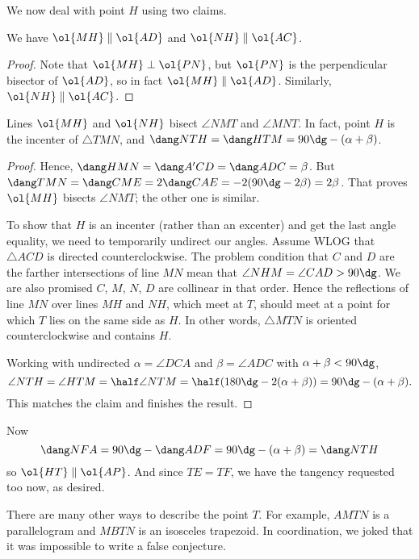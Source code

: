\documentclass[11pt]{scrartcl}
\begin{document}
We now deal with point $H$ using two claims.
\begin{claim*}
  We have $\ol{MH} \parallel \ol{AD}$ and $\ol{NH} \parallel \ol{AC}$.
\end{claim*}
\begin{proof}
  Note that $\ol{MH} \perp \ol{PN}$,
  but $\ol{PN}$ is the perpendicular bisector of $\ol{AD}$,
  so in fact $\ol{MH} \parallel \ol{AD}$.
  Similarly, $\ol{NH} \parallel \ol{AC}$.
\end{proof}
\begin{claim*}
  Lines $\ol{MH}$ and $\ol{NH}$ bisect $\angle NMT$ and $\angle MNT$.
  In fact, point $H$ is the incenter of $\triangle TMN$,
  and $\dang NTH = \dang HTM = 90\dg-(\alpha+\beta)$.
\end{claim*}
\begin{proof}
  Hence, $\dang HMN = \dang A'CD = \dang ADC = \beta$.
  But $\dang TMN = \dang CME = 2 \dang CAE = -2(90\dg-2\beta) = 2\beta$.
  That proves $\ol{MH}$ bisects $\angle NMT$; the other one is similar.

  To show that $H$ is an incenter (rather than an excenter)
  and get the last angle equality, we need to temporarily undirect our angles.
  Assume WLOG that $\triangle ACD$ is directed counterclockwise.
  The problem condition that $C$ and $D$ are the farther intersections of line $MN$
  mean that $\angle NHM = \angle CAD > 90\dg$.
  We are also promised $C$, $M$, $N$, $D$ are collinear in that order.
  Hence the reflections of line $MN$ over lines $MH$ and $NH$, which meet at $T$,
  should meet at a point for which $T$ lies on the same side as $H$.
  In other words, $\triangle MTN$ is oriented counterclockwise and contains $H$.

  Working with undirected $\alpha = \angle DCA$ and $\beta = \angle ADC$ with $\alpha + \beta < 90\dg$,
  \[ \angle NTH = \angle HTM = \half \angle NTM = \half(180\dg-2(\alpha+\beta))
    = 90\dg - (\alpha + \beta). \]
  This matches the claim and finishes the result.
\end{proof}

Now
\[ \dang NFA = 90\dg - \dang ADF = 90\dg-(\alpha+\beta) = \dang NTH \]
so $\ol{HT} \parallel \ol{AP}$.
And since $TE = TF$, we have the tangency requested too now, as desired.

\begin{remark*}
  There are many other ways to describe the point $T$.
  For example, $AMTN$ is a parallelogram and $MBTN$ is an isosceles trapezoid.
  In coordination, we joked that it was impossible to write a false conjecture.
\end{remark*}
\pagebreak
\end{document}
